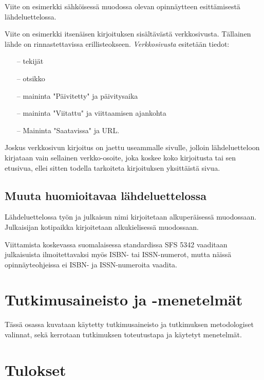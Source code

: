 \documentclass[finnish, 12pt, a4paper, elec, utf8, a-1b, online]{aaltothesis}
\begin{document}
Viite \cite{Adida} on esimerkki sähköisessä muodossa olevan
opinnäytteen esittämisestä lähdeluettelossa.

Viite \cite{viittaaminen} on esimerkki itsenäisen kirjoituksen sisältävästä
verkkosivusta. Tällainen lähde on rinnastettavissa erillisteokseen.
\textit{Verkkosivusta} esitetään tiedot:

\begin{itemize}
\item[--] tekijät
\item[--] otsikko
\item[--] maininta "Päivitetty" ja päivitysaika
\item[--] maininta "Viitattu" ja viittaamisen ajankohta
\item[--] Maininta "Saatavissa" ja URL.
\end{itemize}

Joskus verkkosivun kirjoitus on jaettu useammalle sivulle, jolloin
lähdeluetteloon kirjataan vain sellainen verkko-osoite, joka koskee
koko kirjoitusta tai sen etusivua, ellei sitten
todella tarkoiteta kirjoituksen yksittäistä sivua.

\subsection*{Muuta huomioitavaa lähdeluettelossa}

Lähdeluettelossa työn ja julkaisun nimi kirjoitetaan alkuperäisessä
muodossaan. Julkaisijan kotipaikka kirjoitetaan alkukielisessä
muodossaan.

Viittamista koskevassa suomalaisessa standardissa
SFS 5342 \cite{sfs} vaaditaan julkaisuista ilmoitettavaksi myös ISBN- tai
ISSN-numerot, mutta näissä opinnäyteohjeissa ei ISBN- ja
ISSN-numeroita vaadita.

\clearpage

\section{Tutkimusaineisto ja -menetelmät}

Tässä osassa kuvataan käytetty tutkimusaineisto ja tutkimuksen metodologiset
valinnat, sekä kerrotaan tutkimuksen toteutustapa ja käytetyt menetelmät.

\clearpage

\section{Tulokset}
\end{document}
